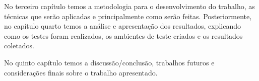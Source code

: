 No terceiro capítulo temos a metodologia para o desenvolvimento do trabalho, as técnicas que serão aplicadas e principalmente como serão feitas. Posteriormente, no capítulo quarto temos a análise e apresentação dos resultados, explicando como os testes foram realizados, os ambientes de teste criados e os resultados coletados.

No quinto capítulo temos a discussão/conclusão, trabalhos futuros e considerações finais sobre o trabalho apresentado.


%
%
%

